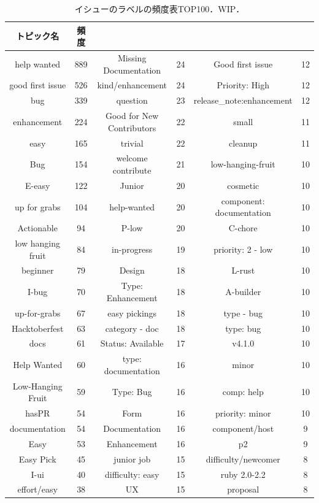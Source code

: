 \begin{table}[t]
\small
  \centering
  \caption{イシューのラベルの頻度表TOP100．WIP．}
  \label{table:issue_label_freq}
  \begin{tabular}{ c | c || c | c || c | c } \Xhline{3\arrayrulewidth}
トピック名 & 頻度 &  &  &  &  \\ \hline \hline
help wanted & 889 & Missing Documentation & 24 & Good first issue & 12 \\
good first issue & 526 & kind/enhancement & 24 & Priority: High & 12 \\
bug & 339 & question & 23 & release_note:enhancement & 12 \\
enhancement & 224 & Good for New Contributors & 22 & small & 11 \\
easy & 165 & trivial & 22 & cleanup & 11 \\
Bug & 154 & welcome contribute & 21 & low-hanging-fruit & 10 \\
E-easy & 122 & Junior & 20 & cosmetic & 10 \\
up for grabs & 104 & help-wanted & 20 & component: documentation & 10 \\
Actionable & 94 & P-low & 20 & C-chore & 10 \\
low hanging fruit & 84 & in-progress & 19 & priority: 2 - low & 10 \\
beginner & 79 & Design & 18 & L-rust & 10 \\
I-bug & 70 & Type: Enhancement & 18 & A-builder & 10 \\
up-for-grabs & 67 & easy pickings & 18 & type - bug & 10 \\
Hacktoberfest & 63 & category - doc & 18 & type: bug & 10 \\
docs & 61 & Status: Available & 17 & v4.1.0 & 10 \\
Help Wanted & 60 & type: documentation & 16 & minor & 10 \\
Low-Hanging Fruit & 59 & Type: Bug & 16 & comp: help & 10 \\
hasPR & 54 & Form & 16 & priority: minor & 10 \\
documentation & 54 & Documentation & 16 & component/host & 9 \\
Easy & 53 & Enhancement & 16 & p2 & 9 \\
Easy Pick & 45 & junior job & 15 & difficulty/newcomer & 8 \\
I-ui & 40 & difficulty: easy & 15 & ruby 2.0-2.2 & 8 \\
effort/easy & 38 & UX & 15 & proposal & 8 \\

\end{tabular}
\end{table}
